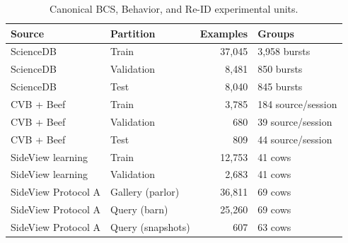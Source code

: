 \begin{table}[htbp]
\centering\small
\caption[Canonical split and retrieval protocol sizes]{Canonical BCS, Behavior, and Re-ID experimental units.}\label{tab:splits}
\begin{tabular}{llrl}
\toprule
Source & Partition & Examples & Groups \\
\midrule
ScienceDB & Train & 37,045 & 3,958 bursts \\
ScienceDB & Validation & 8,481 & 850 bursts \\
ScienceDB & Test & 8,040 & 845 bursts \\
CVB + Beef & Train & 3,785 & 184 source/session \\
CVB + Beef & Validation & 680 & 39 source/session \\
CVB + Beef & Test & 809 & 44 source/session \\
SideView learning & Train & 12,753 & 41 cows \\
SideView learning & Validation & 2,683 & 41 cows \\
SideView Protocol A & Gallery (parlor) & 36,811 & 69 cows \\
SideView Protocol A & Query (barn) & 25,260 & 69 cows \\
SideView Protocol A & Query (snapshots) & 607 & 63 cows \\
\bottomrule
\end{tabular}
\end{table}
